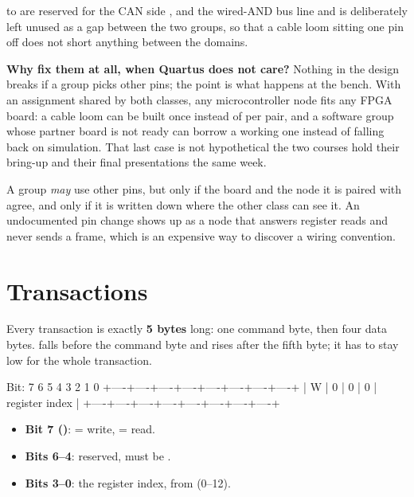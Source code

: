  to  are reserved for the CAN side \textemdash{} ,
 and the wired-AND bus line \textemdash{} and  is deliberately left
unused as a gap between the two groups, so that a cable loom sitting one pin off does not short
anything between the domains.

\textbf{Why fix them at all, when Quartus does not care?} Nothing in the design breaks if a group
picks other pins; the point is what happens at the bench. With an assignment shared by both classes,
any microcontroller node fits any FPGA board: a cable loom can be built once instead of per pair, and
a software group whose partner board is not ready can borrow a working one instead of falling back on
simulation. That last case is not hypothetical \textemdash{} the two courses hold their bring-up and
their final presentations the same week.

A group \emph{may} use other pins, but only if the board and the node it is paired with agree, and
only if it is written down where the other class can see it. An undocumented pin change shows up as a
node that answers register reads and never sends a frame, which is an expensive way to discover a
wiring convention.

\section{Transactions}
\label{app:protocol:transactions}

Every transaction is exactly \textbf{5 bytes} long: one command byte, then four data bytes. 
falls before the command byte and rises after the fifth byte; it has to stay low for the whole
transaction.

\begin{textdrawing}
Bit:      7    6    5    4    3    2    1    0
        +----+----+----+----+----+----+----+----+
        | W  | 0  | 0  | 0  |   register index  |
        +----+----+----+----+----+----+----+----+
\end{textdrawing}

\begin{itemize}
  \item \textbf{Bit 7 ()}:  = write,  = read.
  \item \textbf{Bits 6--4}: reserved, must be .
  \item \textbf{Bits 3--0}: the register index,  from 
    (0--12).
\end{itemize}

